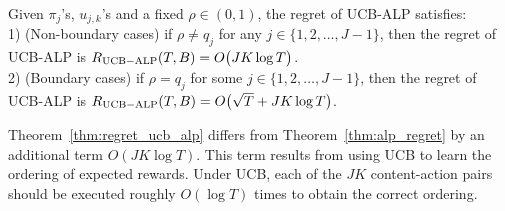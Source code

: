 \begin{theorem}\label{thm:regret_ucb_alp}
Given $\pi_j$'s, $u_{j,k}$'s and a fixed $\rho \in (0,1)$, the regret of UCB-ALP satisfies:\\
1) (Non-boundary cases) if $\rho \neq q_j$ for any $j \in \{1, 2, \ldots, J-1\}$, then the regret of UCB-ALP is $R_{\rm{UCB-ALP}}(T, B) = O\big(JK\log T\big)$.\\
2) (Boundary cases) if $\rho = q_j$ for some $j \in \{ 1,2, \ldots, J-1\}$, then the regret of UCB-ALP is $R_{\rm{UCB-ALP}}(T, B) = O\big(\sqrt{T} + JK\log T \big)$.
\end{theorem}
Theorem~\ref{thm:regret_ucb_alp} differs from Theorem~\ref{thm:alp_regret} by an additional term $O(JK\log T)$. This term results from using UCB to learn the ordering of expected rewards. Under UCB, each of the $JK$ content-action pairs should be executed roughly $O(\log T)$ times to obtain  the correct ordering.
